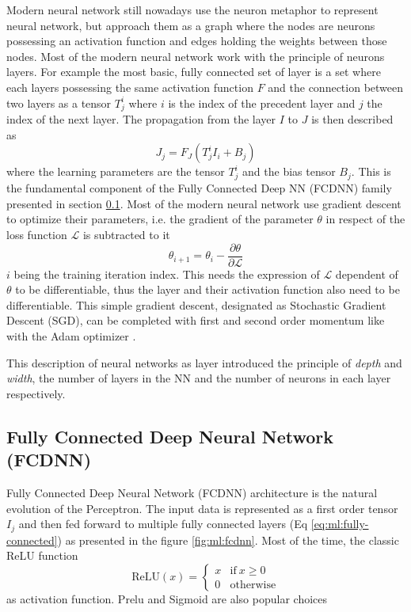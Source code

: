 Modern neural network still nowadays use the neuron metaphor to represent neural network, but approach them as a graph where the nodes are neurons possessing an activation function and edges holding the weights between those nodes. Most of the modern neural network work with the principle of neurons layers. For example the most basic, fully connected set of layer is a set where each layers possessing the same activation function $F$ and the connection between two layers as a tensor $T^{i}_{j}$ where $i$ is the index of the precedent layer and $j$ the index of the next layer. The propagation from the layer $I$ to $J$ is then described as
\begin{equation}
  \label{eq:ml:fully-connected}
  J_{j} = F_J(T_{j}^{i} I_{i} + B_j)
\end{equation}
where the learning parameters are the tensor $T_j^i$ and the bias tensor $B_j$. This is the fundamental component of the Fully Connected Deep NN (FCDNN) family presented in section \ref{sec:ml:fcdnn}. Most of the modern neural network use gradient descent to optimize their parameters, i.e. the gradient of the parameter $\theta$ in respect of the loss function $\mathcal{L}$ is subtracted to it
\begin{equation}
  \theta_{i+1} = \theta_i - \frac{\partial \theta}{\partial \mathcal{L}}
\end{equation}
$i$ being the training iteration index. This needs the expression of $\mathcal{L}$ dependent of $\theta$ to be differentiable, thus the layer and their activation function also need to be differentiable. This simple gradient descent, designated as Stochastic Gradient Descent (SGD), can be completed with first and second order momentum like with the Adam optimizer \cite{kingma_adam_2017}.

This description of neural networks as layer introduced the principle of \textit{depth} and \textit{width}, the number of layers in the NN and the number of neurons in each layer respectively.

\subsection{Fully Connected Deep Neural Network (FCDNN)}
\label{sec:ml:fcdnn}

Fully Connected Deep Neural Network (FCDNN) architecture is the natural evolution of the Perceptron. The input data is represented as a first order tensor $I_j$ and then fed forward to multiple fully connected layers (Eq \ref{eq:ml:fully-connected}) as presented in the figure \ref{fig:ml:fcdnn}. Most of the time, the classic ReLU function
\begin{equation}
  \label{sec:ml:relu}
  \mathrm{ReLU}(x) = \begin{cases}
    x & \mathrm{if} ~ x \geq 0 \\
    0 & \mathrm{otherwise}
  \end{cases}
\end{equation}
as activation function. Prelu and Sigmoid are also popular choices


